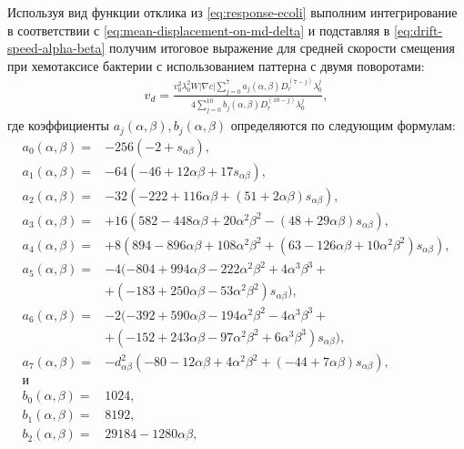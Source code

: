 Используя вид функции отклика из \cref{eq:response-ecoli} выполним интегрирование в соответствии с \cref{eq:mean-displacement-on-md-delta} и подставляя в \cref{eq:drift-speed-alpha-beta} получим итоговое выражение для средней скорости смещения при хемотаксисе бактерии с использованием паттерна с двумя поворотами:
\begin{equation}
    \begin{aligned}
        v_d=\frac{v_0^2\lambda_0^2W|\nabla c|\sum_{j=0}^{7} a_j(\alpha, \beta)D_r^(7-j)\lambda_0^j}{4\sum_{j=0}^{10}b_j(\alpha,\beta)D_r^(10-j)\lambda_0^j},
        \label{eq:drift-speed-solution}
    \end{aligned}
\end{equation}
где коэффициенты $a_j(\alpha,\beta), b_j(\alpha,\beta)$ определяются по следующим формулам:
\begin{equation}
    \begin{aligned}
	a_0(\alpha, \beta) =& - 256\left (-2+s_{\alpha\beta}\right ), \\
	a_1(\alpha, \beta) =& - 64\left (-46+12\alpha\beta+17s_{\alpha\beta}\right ), \\
	a_2(\alpha, \beta) =& - 32\left (-222+116\alpha\beta+(51+2\alpha\beta)s_{\alpha\beta}\right ), \\
	a_3(\alpha, \beta) =& +16\left ( 582-448\alpha\beta+20\alpha^2\beta^2-(48+29\alpha\beta)s_{\alpha\beta} \right ), \\
	a_4(\alpha, \beta) =& +8\left ( 894-896\alpha\beta+108\alpha^2\beta^2+(63-126\alpha\beta+10\alpha^2\beta^2)s_{\alpha\beta} \right ), \\
	a_5(\alpha, \beta) =& - 4( -804+994\alpha\beta-222\alpha^2\beta^2+4\alpha^3\beta^3+\\
    &+(-183+250\alpha\beta-53\alpha^2\beta^2)s_{\alpha\beta} ), \\
	a_6(\alpha, \beta) =& - 2( -392+590\alpha\beta-194\alpha^2\beta^2-4\alpha^3\beta^3+\\
    &+(-152+243\alpha\beta-97\alpha^2\beta^2+6\alpha^3\beta^3)s_{\alpha\beta} ), \\
	a_7(\alpha, \beta) =& - d_{\alpha\beta}^2\left ( -80-12\alpha\beta+4\alpha^2\beta^2+(-44+7\alpha\beta)s_{\alpha\beta} \right ),\\
    \textrm{и}\\
	b_0(\alpha, \beta) =& 1024, \\
	b_1(\alpha, \beta) =& 8192, \\
	b_2(\alpha, \beta) =& 29184 - 1280\alpha\beta, \\

\end{aligned}
\end{equation}
